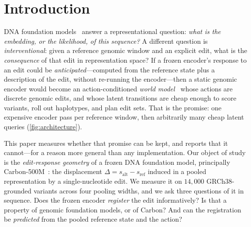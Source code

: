 \documentclass{article}
\newcommand{\sref}{s_{\mathrm{ref}}}
\newcommand{\salt}{s_{\mathrm{alt}}}
\newcommand{\D}{\Delta}
\newcommand{\carbon}{Carbon-500M\xspace}
\begin{document}
\begin{abstract}
geometry is not a restatement of the model's own likelihood: it beats $\Delta\log$-likelihood on
identical variants ($0.9255$ vs.\ $0.8945$), correlates with it only weakly ($\rho = -0.24$),
retains $0.853$ once it is residualised out, and ensembles to $0.948$. We report these AUROCs as
cohort-dependent---$\Delta\log$-likelihood reaches $0.89$ on our ClinVar slice against
$0.6$--$0.8$ in the literature, so the slice is easy---and we make no claim to a competitive
variant-effect predictor; transfer to quantitative function is weak ($\rho = -0.27$). These
results supersede our withdrawn \texttt{v0.2.1-r1} release, whose implementation defects were
real but incidental: the bottleneck we identify would have defeated a correct implementation too.
For an action-conditioned latent world model over pooled genomic features, there is no shortcut
through the latent---the encoder must be run on the edited sequence.
\end{abstract}

\section{Introduction}
\label{sec:intro}

DNA foundation models~\citep{dnabert2021,hyenadna2023,nucleotidetransformer2025,caduceus2024,evo2024}
answer a representational question: \emph{what is the embedding, or the likelihood, of this
sequence?} A different question is \emph{interventional}: given a reference genomic window and an
explicit edit, what is the \emph{consequence} of that edit in representation space? If a frozen
encoder's response to an edit could be \emph{anticipated}---computed from the reference state plus
a description of the edit, without re-running the encoder---then a static genomic encoder would
become an action-conditioned \emph{world model}~\citep{worldmodels2018,dreamerv3} whose actions are
discrete genomic edits, and whose latent transitions are cheap enough to score variants, roll out
haplotypes, and plan edit sets. That is the promise: one expensive encoder pass per reference
window, then arbitrarily many cheap latent queries (\cref{fig:architecture}).

This paper measures whether that promise can be kept, and reports that it cannot---for a reason more
general than any implementation. Our object of study is the \emph{edit-response geometry} of a
frozen DNA foundation model, principally \carbon~\citep{carbon500m}: the displacement
$\D=\salt-\sref$ induced in a pooled representation by a single-nucleotide edit. We measure it on
$14{,}000$ GRCh38-grounded variants across four pooling widths, and we ask three questions of it in
sequence. Does the frozen encoder \emph{register} the edit informatively? Is that a property of
genomic foundation models, or of Carbon? And can the registration be \emph{predicted} from the
pooled reference state and the action?
\end{document}
